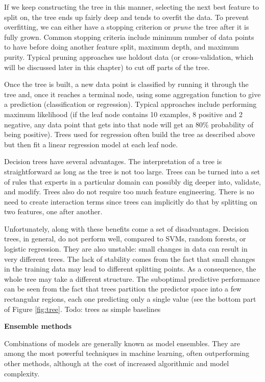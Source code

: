 \documentclass[]{krantz}
\begin{document}
If we keep constructing the tree in this manner, selecting the next best
feature to split on, the tree ends up fairly deep and tends to overfit
the data. To prevent overfitting, we can either have a stopping
criterion or \emph{prune} the tree after it is fully grown. Common
stopping criteria include minimum number of data points to have before
doing another feature split, maximum depth, and maximum purity. Typical
pruning approaches use holdout data (or cross-validation, which will be
discussed later in this chapter) to cut off parts of the tree.

Once the tree is built, a new data point is classified by running it
through the tree and, once it reaches a terminal node, using some
aggregation function to give a prediction (classification or
regression). Typical approaches include performing maximum likelihood
(if the leaf node contains 10 examples, 8 positive and 2 negative, any
data point that gets into that node will get an 80\% probability of
being positive). Trees used for regression often build the tree as
described above but then fit a linear regression model at each leaf
node.

Decision trees have several advantages. The interpretation of a tree is
straightforward as long as the tree is not too large. Trees can be
turned into a set of rules that experts in a particular domain can
possibly dig deeper into, validate, and modify. Trees also do not
require too much feature engineering. There is no need to create
interaction terms since trees can implicitly do that by splitting on two
features, one after another.

Unfortunately, along with these benefits come a set of disadvantages.
Decision trees, in general, do not perform well, compared to SVMs,
random forests, or logistic regression. They are also unstable: small
changes in data can result in very different trees. The lack of
stability comes from the fact that small changes in the training data
may lead to different splitting points. As a consequence, the whole tree
may take a different structure. The suboptimal predictive performance
can be seen from the fact that trees partition the predictor space into
a few rectangular regions, each one predicting only a single value (see
the bottom part of Figure \ref{fig:tree}. Todo: trees as simple
baselines

\textbf{Ensemble methods}

Combinations of models are generally known as model ensembles. They are
among the most powerful techniques in machine learning, often
outperforming other methods, although at the cost of increased
algorithmic and model complexity.
\end{document}
